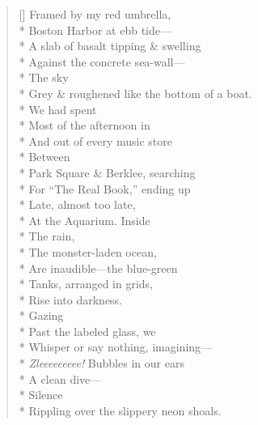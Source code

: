 \label{ch:harbor}
\begin{verse}[\versewidth]
Framed by my red umbrella,\\*
Boston Harbor at ebb tide---\\*
A slab of basalt tipping \& swelling\\*
Against the concrete sea-wall---\\*
\hspace*{4\vgap} The sky\\*
Grey \& roughened like the bottom of a boat.\\*
We had spent\\*
Most of the afternoon in\\*
And out of every music store\\*
\hspace*{4\vgap} Between\\*
Park Square \& Berklee, searching\\*
For ``The Real Book,'' ending up\\*
Late, almost too late,\\*
At the Aquarium.     Inside\\*
\hspace*{4\vgap} The rain,\\*
The monster-laden ocean,\\*
Are inaudible---the blue-green\\*
Tanks, arranged in grids,\\*
Rise into darkness.\\*
\hspace*{4\vgap} Gazing\\*
Past the labeled glass, we\\*
Whisper or say nothing, imagining---\\*
\textit{Zleeeeeeeee!} Bubbles in our ears\\*
A clean dive---\\*
\hspace*{3\vgap} Silence\\*
Rippling over the slippery neon shoals.
\end{verse}
